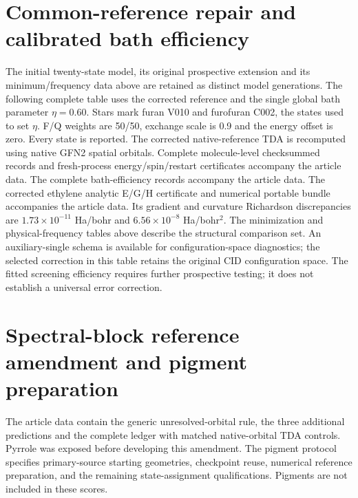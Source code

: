 \documentclass[11pt,a4paper]{article}
\begin{document}
\section{Common-reference repair and calibrated bath efficiency}
The initial twenty-state model, its original prospective extension and its
minimum/frequency data above are retained as distinct model generations.
The following complete table uses the corrected reference and the single
global bath parameter $\eta=0.60$. Stars mark furan V010 and furofuran C002,
the states used to set $\eta$. F/Q weights are 50/50, exchange scale is 0.9
and the energy offset is zero. Every state is reported.
{\small\setlength{\tabcolsep}{4pt}}
The corrected native-reference TDA is recomputed using native GFN2 spatial
orbitals. Complete molecule-level checksummed records and fresh-process
energy/spin/restart certificates accompany the article data.
The complete bath-efficiency records accompany the article data.
The corrected ethylene analytic E/G/H certificate and numerical portable
bundle accompanies the article data.
Its gradient and curvature Richardson discrepancies are
$1.73\times10^{-11}$ Ha/bohr and $6.56\times10^{-8}$ Ha/bohr$^2$.
The minimization and physical-frequency tables above describe the structural
comparison set. An auxiliary-single schema is available for configuration-space
diagnostics; the selected correction in this table retains the original CID
configuration space. The fitted screening efficiency requires further
prospective testing; it does not establish a universal error correction.

\clearpage


\clearpage
\section{Spectral-block reference amendment and pigment preparation}
\begingroup\small\raggedright
The article data contain the generic unresolved-orbital rule, the three
additional predictions and the complete ledger with matched native-orbital
TDA controls. Pyrrole was exposed before developing
this amendment.
The pigment protocol specifies primary-source starting geometries,
checkpoint reuse, numerical reference preparation, and the remaining
state-assignment qualifications. Pigments are not included in these scores.\par\endgroup

\end{document}
